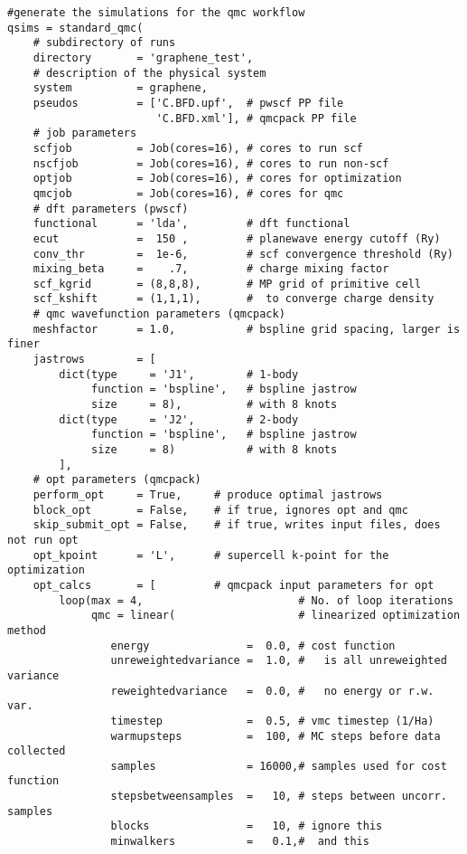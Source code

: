 \documentclass[oneside,11pt]{memoir}
\numberwithin{equation}{section}
\begin{document}
\begin{verbatim}
#generate the simulations for the qmc workflow
qsims = standard_qmc(
    # subdirectory of runs 
    directory       = 'graphene_test',
    # description of the physical system
    system          = graphene,
    pseudos         = ['C.BFD.upf',  # pwscf PP file
                       'C.BFD.xml'], # qmcpack PP file
    # job parameters
    scfjob          = Job(cores=16), # cores to run scf 
    nscfjob         = Job(cores=16), # cores to run non-scf 
    optjob          = Job(cores=16), # cores for optimization 
    qmcjob          = Job(cores=16), # cores for qmc
    # dft parameters (pwscf)
    functional      = 'lda',         # dft functional
    ecut            =  150 ,         # planewave energy cutoff (Ry)
    conv_thr        =  1e-6,         # scf convergence threshold (Ry)
    mixing_beta     =    .7,         # charge mixing factor
    scf_kgrid       = (8,8,8),       # MP grid of primitive cell
    scf_kshift      = (1,1,1),       #  to converge charge density
    # qmc wavefunction parameters (qmcpack)
    meshfactor      = 1.0,           # bspline grid spacing, larger is finer
    jastrows        = [
        dict(type     = 'J1',        # 1-body
             function = 'bspline',   # bspline jastrow
             size     = 8),          # with 8 knots
        dict(type     = 'J2',        # 2-body
             function = 'bspline',   # bspline jastrow
             size     = 8)           # with 8 knots
        ],
    # opt parameters (qmcpack)
    perform_opt     = True,     # produce optimal jastrows
    block_opt       = False,    # if true, ignores opt and qmc
    skip_submit_opt = False,    # if true, writes input files, does not run opt
    opt_kpoint      = 'L',      # supercell k-point for the optimization
    opt_calcs       = [         # qmcpack input parameters for opt
        loop(max = 4,                        # No. of loop iterations
             qmc = linear(                   # linearized optimization method
                energy               =  0.0, # cost function
                unreweightedvariance =  1.0, #   is all unreweighted variance
                reweightedvariance   =  0.0, #   no energy or r.w. var. 
                timestep             =  0.5, # vmc timestep (1/Ha)
                warmupsteps          =  100, # MC steps before data collected 
                samples              = 16000,# samples used for cost function 
                stepsbetweensamples  =   10, # steps between uncorr. samples
                blocks               =   10, # ignore this  
                minwalkers           =   0.1,#  and this

\end{verbatim}
\end{document}
